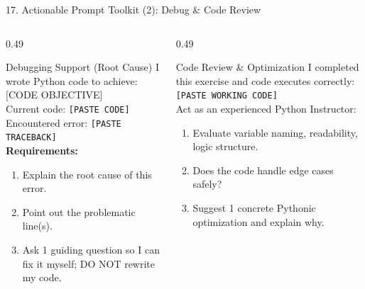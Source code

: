 \documentclass[aspectratio=169, 10pt]{beamer}
\begin{document}
\begin{frame}{17. Actionable Prompt Toolkit (2): Debug \& Code Review}
  \begin{columns}[T]
    \begin{column}{0.49\textwidth}
      \begin{cbox}[accentorange]{Debugging Support (Root Cause)}
        \scriptsize
        I wrote Python code to achieve: [CODE OBJECTIVE]\\[2pt]
        Current code: \texttt{[PASTE CODE]}\\[2pt]
        Encountered error: \texttt{[PASTE TRACEBACK]}\\[2pt]
        \textbf{Requirements:}
        \begin{enumerate}\setlength{\itemsep}{1pt}
          \item Explain the root cause of this error.
          \item Point out the problematic line(s).
          \item Ask 1 guiding question so I can fix it myself; DO NOT rewrite my code.
        \end{enumerate}
      \end{cbox}
    \end{column}
    \begin{column}{0.49\textwidth}
      \begin{cbox}[primaryblue]{Code Review \& Optimization}
        \scriptsize
        I completed this exercise and code executes correctly: \texttt{[PASTE WORKING CODE]}\\[2pt]
        Act as an experienced Python Instructor:
        \begin{enumerate}\setlength{\itemsep}{1pt}
          \item Evaluate variable naming, readability, logic structure.
          \item Does the code handle edge cases safely?
          \item Suggest 1 concrete Pythonic optimization and explain why.
        \end{enumerate}
      \end{cbox}
    \end{column}
  \end{columns}
\end{frame}
\end{document}
